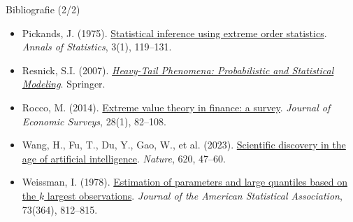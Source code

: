 \begin{frame}{Bibliografie (2/2)}
\begin{itemize}
    \item Pickands, J. (1975). \href{https://doi.org/10.1214/aos/1176343003}{Statistical inference using extreme order statistics}. \textit{Annals of Statistics}, 3(1), 119--131.
    \item Resnick, S.I. (2007). \href{https://doi.org/10.1007/978-0-387-45024-7}{\textit{Heavy-Tail Phenomena: Probabilistic and Statistical Modeling}}. Springer.
    \item Rocco, M. (2014). \href{https://doi.org/10.1111/j.1467-6419.2012.00744.x}{Extreme value theory in finance: a survey}. \textit{Journal of Economic Surveys}, 28(1), 82--108.
    \item Wang, H., Fu, T., Du, Y., Gao, W., et al. (2023). \href{https://doi.org/10.1038/s41586-023-06221-2}{Scientific discovery in the age of artificial intelligence}. \textit{Nature}, 620, 47--60.
    \item Weissman, I. (1978). \href{https://doi.org/10.1080/01621459.1978.10480104}{Estimation of parameters and large quantiles based on the $k$ largest observations}. \textit{Journal of the American Statistical Association}, 73(364), 812--815.
\end{itemize}
\end{frame}


